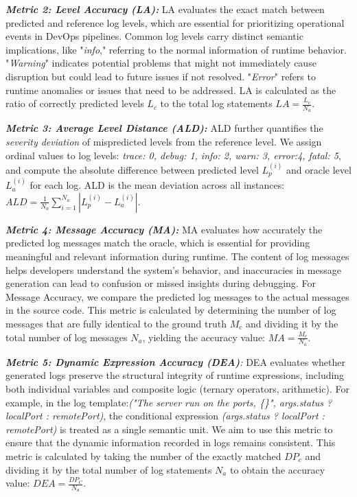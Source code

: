 \textit{\textbf{Metric 2: Level Accuracy (LA):}}  
LA evaluates the exact match between predicted and reference log levels, which are essential for prioritizing operational events in DevOps pipelines. Common log levels carry distinct semantic implications, like "\textit{info}," referring to the normal information of runtime behavior.  "\textit{Warning}" indicates potential problems that might not immediately cause disruption but could lead to future issues if not resolved. "\textit{Error}" refers to runtime anomalies or issues that need to be addressed.
LA is calculated as the ratio of correctly predicted levels $L_c$ to the total log statements \(LA = \frac{L_c}{N_a}\).


\textbf{\textit{Metric 3: Average Level Distance (ALD):}} ALD further quantifies the \textit{severity deviation} of mispredicted levels from the reference level. We assign ordinal values to log levels: 
\textit{trace: 0, debug: 1, info: 2, warn: 3, error:4, fatal: 5}, and compute the absolute difference between predicted level $L_p^{(i)}$ and oracle level $L_a^{(i)}$ for each log. ALD is the mean deviation across all instances: $ ALD = \frac{1}{N_a} \sum_{i=1}^{N_a} \left| L_p^{(i)} - L_a^{(i)} \right| $.


\textit{\textbf{Metric 4: Message Accuracy (MA):}}
MA evaluates how accurately the predicted log messages match the oracle, which is essential for providing meaningful and relevant information during runtime. The content of log messages helps developers understand the system’s behavior, and inaccuracies in message generation can lead to confusion or missed insights during debugging. For Message Accuracy, we compare the predicted log messages to the actual messages in the source code. This metric is calculated by determining the number of log messages that are fully identical to the ground truth \(M_c\) and dividing it by the total number of log messages \(N_a\), yielding the accuracy value: \(MA = \frac{M_c}{N_a}\).

\textit{\textbf{Metric 5: Dynamic Expression Accuracy (DEA)}:} DEA evaluates whether generated logs preserve the structural integrity of runtime expressions, including both individual variables and composite logic (\eg ternary operators, arithmetic). For example, in the log template:\textit{("The server run on the ports, \{\}", args.status ? localPort : remotePort)}, the conditional expression \textit{(args.status ? localPort : remotePort)} is treated as a single semantic unit.
We aim to use this metric to ensure that the dynamic information recorded in logs remains consistent. This metric is calculated by taking the number of the exactly matched \(DP_c\) and dividing it by the total number of log statements \(N_a\) to obtain the accuracy value: \(DEA = \frac{DP_C}{N_a}\).

